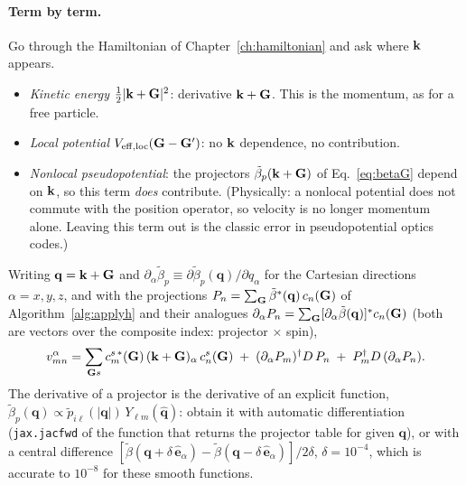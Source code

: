 \paragraph{Term by term.} Go through the Hamiltonian of
Chapter~\ref{ch:hamiltonian} and ask where $\mathbf{k}$ appears.
\begin{itemize}[leftmargin=2em]
\item \emph{Kinetic energy} $\tfrac12|\mathbf{k}+\mathbf{G}|^2$: derivative $\mathbf{k}+\mathbf{G}$.
This is the momentum, as for a free particle.
\item \emph{Local potential} $V_{\mathrm{eff,loc}}(\mathbf{G}-\mathbf{G}')$: no $\mathbf{k}$
dependence, no contribution.
\item \emph{Nonlocal pseudopotential}: the projectors
$\tilde\beta_p(\mathbf{k}+\mathbf{G})$ of Eq.~\eqref{eq:betaG} depend on $\mathbf{k}$, so this
term \emph{does} contribute. (Physically: a nonlocal potential does not
commute with the position operator, so velocity is no longer momentum
alone. Leaving this term out is the classic error in pseudopotential
optics codes.)
\end{itemize}
Writing $\mathbf q = \mathbf{k}+\mathbf{G}$ and $\partial_\alpha\tilde\beta_p \equiv
\partial\tilde\beta_p(\mathbf q)/\partial q_\alpha$ for the Cartesian
directions $\alpha = x,y,z$, and with the projections
$P_{n} = \sum_{\mathbf{G}}\tilde\beta^*(\mathbf q)\,c_n(\mathbf{G})$ of
Algorithm~\ref{alg:applyh} and their analogues
$\partial_\alpha P_{n} = \sum_{\mathbf{G}}[\partial_\alpha\tilde\beta(\mathbf q)]^*
c_n(\mathbf{G})$ (both are vectors over the composite index: projector $\times$
spin),
\begin{equation}
v^{\alpha}_{mn} = \sum_{\mathbf{G} s} c^{s\,*}_{m}(\mathbf{G})\,(\mathbf{k}+\mathbf{G})_\alpha\,
c^{s}_{n}(\mathbf{G})
\;+\; (\partial_\alpha P_m)^\dagger D\, P_n
\;+\; P_m^\dagger D\, (\partial_\alpha P_n).
\label{eq:vmn}
\end{equation}
The derivative of a projector is the derivative of an explicit function,
$\tilde\beta_p(\mathbf q) \propto \tilde p_{i\ell}(|\mathbf q|)\,
Y_{\ell m}(\hat{\mathbf q})$: obtain it with automatic differentiation
(\texttt{jax.jacfwd} of the function that returns the projector table for
given $\mathbf q$), or with a central difference
$[\tilde\beta(\mathbf q + \delta\,\hat{\mathbf e}_\alpha)
- \tilde\beta(\mathbf q - \delta\,\hat{\mathbf e}_\alpha)]/2\delta$,
$\delta = 10^{-4}$, which is accurate to $10^{-8}$ for these smooth
functions.

